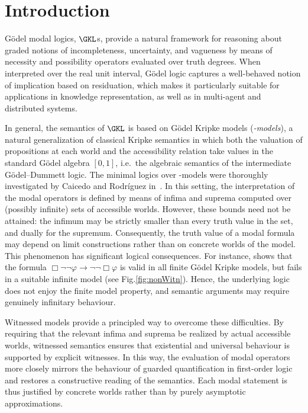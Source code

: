
\section{Introduction}\label{sec:intro}

G\"odel modal logics, $\GKL$s, provide a natural framework for reasoning
about graded notions of incompleteness, uncertainty, and vagueness by
means of necessity and possibility operators evaluated over truth
degrees. When interpreted over the real unit interval, G\"odel logic
captures a well-behaved notion of implication based on residuation,
which makes it particularly suitable for applications in knowledge
representation, as well as in multi-agent and distributed systems.


In general, the semantics of $\GKL$ is based on G\"odel Kripke models
(\emph{\GM-models}), a natural generalization of classical Kripke
semantics in which both the valuation of propositions at each world
and the accessibility relation take values in the standard G\"odel
algebra $[0,1]$, i.e.\ the algebraic semantics of the intermediate
G\"odel--Dummett logic. The minimal logics over {\GM-models} were
thoroughly investigated by Caicedo and Rodr\'iguez
in~\cite{CaiRod2010,CaiRod2015}.  In this setting, the interpretation
of the modal operators is defined by means of infima and suprema
computed over (possibly infinite) sets of accessible worlds. However,
these bounds need not be attained: the infimum may be strictly smaller
than every truth value in the set, and dually for the
supremum. Consequently, the truth value of a modal formula may depend
on limit constructions rather than on concrete worlds of the model.
This phenomenon has significant logical consequences. For instance,
\cite{CaiRod2010} shows that the formula $\Box \neg \neg \varphi \to
\neg \neg \Box \varphi$ is valid in all finite G\"odel Kripke models,
but fails in a suitable infinite model (see
Fig.\ref{fig:nonWitn}). Hence, the underlying logic does not enjoy the
finite model property, and semantic arguments may require genuinely
infinitary behaviour.

Witnessed models provide a principled way to overcome these
difficulties. By requiring that the relevant infima and suprema be
realized by actual accessible worlds, witnessed semantics ensures that
existential and universal behaviour is supported by explicit
witnesses. In this way, the evaluation of modal operators more closely
mirrors the behaviour of guarded quantification in first-order logic
and restores a constructive reading of the semantics. Each modal
statement is thus justified by concrete worlds rather than by purely
asymptotic approximations.


